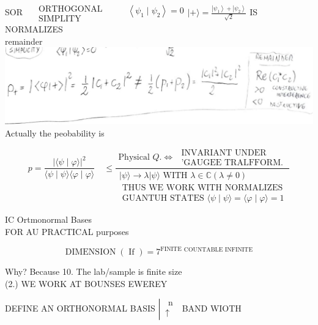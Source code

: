 \documentclass[10pt]{article}
\begin{document}
SOR $\begin{aligned} & \text { ORTHOGONAL } \\ & \text { SIMPLITY }\end{aligned} \quad \begin{aligned} & \left\langle\psi_{1} \mid \psi_{2}\right\rangle=0 \\ & \end{aligned}|+\rangle=\frac{\left|\psi_{1}\right\rangle+\left|\psi_{2}\right\rangle}{\sqrt{2}}$ IS NORMALIZES\\
remainder\\
\includegraphics[max width=\textwidth, center]{2025_10_16_f02af6fa434c9f0bcc00g-04}\\
Actually the peobability is

$$
p=\frac{|\langle\psi \mid \varphi\rangle|^{2}}{\langle\psi \mid \psi\rangle\langle\varphi \mid \varphi\rangle} \quad \leqslant \frac{\text { Physical } Q . \Leftrightarrow \begin{array}{l}
\text { INVARIANT UNDER } \\
\text { 'GAUGEE TRALFFORM. }
\end{array}}{\begin{array}{r}
|\psi\rangle \rightarrow \lambda|\psi\rangle \text { WITH } \lambda \in \mathbb{C}(\lambda \neq 0) \\
\text { THUS WE WORK WITH NORMALIZES } \\
\text { GUANTUH STATES }\langle\psi \mid \psi\rangle=\langle\varphi \mid \varphi\rangle=1
\end{array}}
$$

IC Ortmonormal Bases\\
FOR AU PRACTICAL purposes

$$
\operatorname{DIMENSION}(\text { If })=7^{\text {FINITE }}{ }^{\text {COUNTABLE INFINITE }}
$$

Why? Because 10. The lab/sample is finite size\\
(2.) WE WORK AT BOUNSES EWEREY

DEFINE AN ORTHONORMAL BASIS $\left\lvert\, \begin{gathered}\text { n } \\ \uparrow\end{gathered}\right.$ BAND WIOTH
\end{document}
